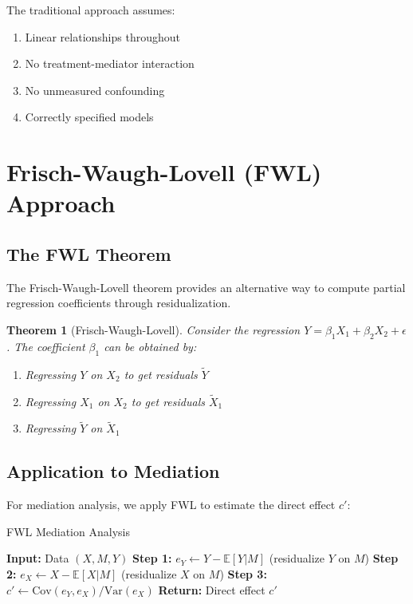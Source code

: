 \documentclass[11pt,a4paper]{article}
\newtheorem{theorem}{Theorem}
\newcommand{\E}{\mathbb{E}}
\newcommand{\Var}{\text{Var}}
\newcommand{\Cov}{\text{Cov}}
\begin{document}
The traditional approach assumes:
\begin{enumerate}
    \item Linear relationships throughout
    \item No treatment-mediator interaction
    \item No unmeasured confounding
    \item Correctly specified models
\end{enumerate}

\section{Frisch-Waugh-Lovell (FWL) Approach}

\subsection{The FWL Theorem}

The Frisch-Waugh-Lovell theorem provides an alternative way to compute partial regression coefficients through residualization.

\begin{theorem}[Frisch-Waugh-Lovell]
Consider the regression $Y = \beta_1 X_1 + \beta_2 X_2 + \epsilon$. The coefficient $\beta_1$ can be obtained by:
\begin{enumerate}
    \item Regressing $Y$ on $X_2$ to get residuals $\tilde{Y}$
    \item Regressing $X_1$ on $X_2$ to get residuals $\tilde{X}_1$
    \item Regressing $\tilde{Y}$ on $\tilde{X}_1$
\end{enumerate}
\end{theorem}

\subsection{Application to Mediation}

For mediation analysis, we apply FWL to estimate the direct effect $c'$:

\begin{algorithm}
\caption{FWL Mediation Analysis}
\begin{algorithmic}
\STATE \textbf{Input:} Data $(X, M, Y)$
\STATE \textbf{Step 1:} $e_Y \leftarrow Y - \E[Y|M]$ (residualize $Y$ on $M$)
\STATE \textbf{Step 2:} $e_X \leftarrow X - \E[X|M]$ (residualize $X$ on $M$)
\STATE \textbf{Step 3:} $c' \leftarrow \Cov(e_Y, e_X) / \Var(e_X)$
\STATE \textbf{Return:} Direct effect $c'$
\end{algorithmic}
\end{algorithm}
\end{document}
